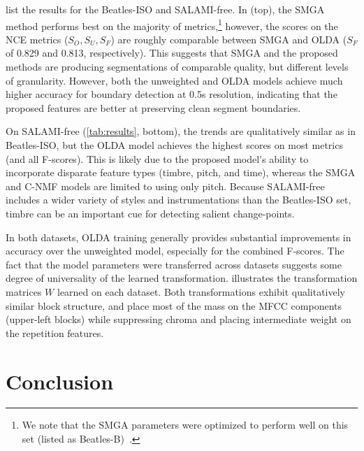 \documentclass{article}
\begin{document}
 list the results for the Beatles-ISO and SALAMI-free.
In  (top), the SMGA method performs best on the majority of metrics,\footnote{We
note that the SMGA parameters were optimized to perform well on this set (listed as
Beatles-B)~\cite{serra2012unsupervised}.}
however, the scores on the NCE metrics ($S_O, S_U, S_F$) are roughly comparable between SMGA and OLDA ($S_F$ of 0.829
and 0.813, respectively). 
This suggests that SMGA and the proposed methods are producing segmentations of comparable quality, but 
different levels of granularity.
However, both the unweighted and OLDA models achieve much higher accuracy for boundary detection at 0.5s resolution,
indicating that the proposed features are better at preserving clean segment boundaries.  

On SALAMI-free (\cref{tab:results}, bottom), the trends are qualitatively similar as in Beatles-ISO, but the OLDA
model achieves the highest scores on most metrics (and all F-scores). This is likely due to the proposed model's
ability to incorporate disparate feature types (timbre, pitch, and time), whereas the SMGA and C-NMF models are
limited to using only pitch. 
Because SALAMI-free includes a wider variety of styles and instrumentations than the Beatles-ISO set, 
timbre can be an important cue for detecting salient change-points.

In both datasets, OLDA training generally provides substantial improvements in accuracy over the unweighted model, 
especially for the combined F-scores.
The fact that the model parameters were transferred across datasets suggests some degree of universality of the
learned transformation.   illustrates the transformation matrices $W$ learned on each dataset. Both
transformations exhibit qualitatively similar block structure, and place most of the mass on the MFCC components
(upper-left blocks) while suppressing chroma and placing intermediate weight on the repetition features.



\section{Conclusion}
\label{sec:conclusion}




\end{document}
